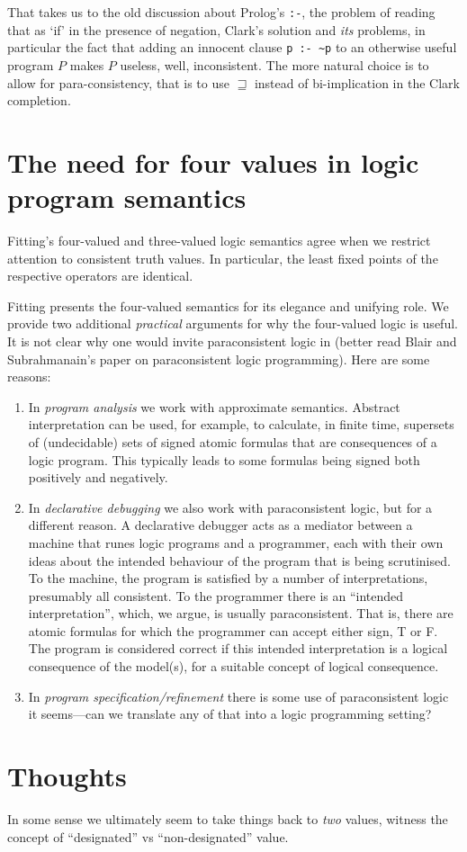 \documentclass{llncs}
\begin{document}
That takes us to the old discussion about Prolog's \verb!:-!,
the problem of reading that as `if' in the presence of negation,
Clark's solution and \emph{its} problems, in particular the fact
that adding an innocent clause \verb!p :- ~p! to an otherwise
useful program $P$ makes $P$ useless, well, inconsistent.
The more natural choice is to allow for para-consistency, that
is to use $\sqsupseteq$ instead of bi-implication in the Clark
completion.

\section{The need for four values in logic program semantics}

Fitting's four-valued and three-valued logic semantics agree
when we restrict attention to consistent truth values.
In particular, the least fixed points of the respective
operators are identical.

Fitting presents the four-valued semantics for its elegance and
unifying role.
We provide two additional \emph{practical} arguments for why the four-valued
logic is useful.
It is not clear why one would invite paraconsistent logic in
(better read Blair and Subrahmanain's paper on paraconsistent logic
programming).
Here are some reasons:
\begin{enumerate}
\item
In \emph{program analysis} we work with approximate semantics.
Abstract interpretation can be used, for example, to calculate,
in finite time, supersets of (undecidable) sets of signed atomic 
formulas that are consequences of a logic program.
This typically leads to some formulas being signed both positively
and negatively.
\item
In \emph{declarative debugging} we also work with paraconsistent
logic, but for a different reason.
A declarative debugger acts as a mediator between a machine that
runes logic programs
and a programmer, each with their own ideas about the intended
behaviour of the program that is being scrutinised.
To the machine, the program is satisfied by a number of interpretations,
presumably all consistent.
To the programmer there is an ``intended interpretation'', which, we argue,
is usually paraconsistent.
That is, there are atomic formulas for which the programmer can accept 
either sign, T or F.
The program is considered correct if this intended interpretation is
a logical consequence of the model(s), for a suitable
concept of logical consequence.
\item
In \emph{program specification/refinement} there is some use of
paraconsistent logic it seems---can we translate any of that into
a logic programming setting?
\end{enumerate}

\section{Thoughts}

In some sense we ultimately seem to take things back to \emph{two} values,
witness the concept of ``designated'' vs ``non-designated'' value.



\end{document}
